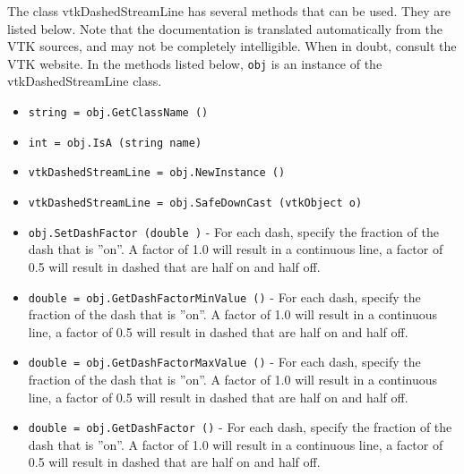 The class vtkDashedStreamLine has several methods that can be used.
  They are listed below.
Note that the documentation is translated automatically from the VTK sources,
and may not be completely intelligible.  When in doubt, consult the VTK website.
In the methods listed below, \verb|obj| is an instance of the vtkDashedStreamLine class.
\begin{itemize}
\item  \verb|string = obj.GetClassName ()|

\item  \verb|int = obj.IsA (string name)|

\item  \verb|vtkDashedStreamLine = obj.NewInstance ()|

\item  \verb|vtkDashedStreamLine = obj.SafeDownCast (vtkObject o)|

\item  \verb|obj.SetDashFactor (double )| -  For each dash, specify the fraction of the dash that is ''on''. A factor
 of 1.0 will result in a continuous line, a factor of 0.5 will result in 
 dashed that are half on and half off.

\item  \verb|double = obj.GetDashFactorMinValue ()| -  For each dash, specify the fraction of the dash that is ''on''. A factor
 of 1.0 will result in a continuous line, a factor of 0.5 will result in 
 dashed that are half on and half off.

\item  \verb|double = obj.GetDashFactorMaxValue ()| -  For each dash, specify the fraction of the dash that is ''on''. A factor
 of 1.0 will result in a continuous line, a factor of 0.5 will result in 
 dashed that are half on and half off.

\item  \verb|double = obj.GetDashFactor ()| -  For each dash, specify the fraction of the dash that is ''on''. A factor
 of 1.0 will result in a continuous line, a factor of 0.5 will result in 
 dashed that are half on and half off.

\end{itemize}
